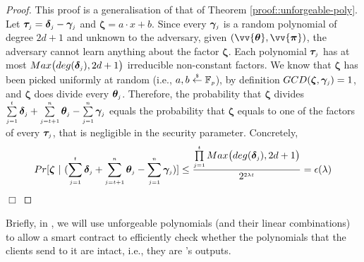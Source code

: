 \begin{proof}  
This proof is a generalisation of that of Theorem \ref{proof::unforgeable-poly}.  
Let $\bm\tau_{\scriptscriptstyle j}=\bm\delta_{\scriptscriptstyle j}-\bm\gamma_{\scriptscriptstyle j}$ and $\bm\zeta=a\cdot x+b$. Since  every $\bm\gamma_{\scriptscriptstyle j}$ is a random polynomial of degree $2d+1$ and unknown to the adversary, given $(\vv{\bm\theta}, \vv{\bm\pi})$,  the adversary cannot learn anything about the factor $\bm\zeta$. Each polynomial $\bm\tau_{\scriptscriptstyle j}$ has at most $Max\big(deg(\bm\delta_{\scriptscriptstyle j}), 2d+1\big)$ irreducible non-constant factors. 
%
%
We  know that $\bm\zeta$ has been picked uniformly at random (i.e., $a,b
\stackrel{\scriptscriptstyle \$}\leftarrow \mathbb F_{\scriptscriptstyle p}$), by definition $GCD(\bm\zeta, \bm\gamma_{\scriptscriptstyle j})=1$, and $\bm\zeta$  does divide every $\bm\theta_{\scriptscriptstyle j}$. Therefore, the probability that $\bm\zeta$ divides $\sum\limits_{\scriptscriptstyle j=1}^{\scriptscriptstyle t}\bm\delta_{\scriptscriptstyle j} + \sum\limits_{\scriptscriptstyle j=t+1}^{\scriptscriptstyle n}\bm\theta_{\scriptscriptstyle j} - \sum\limits_{\scriptscriptstyle j=1}^{\scriptscriptstyle n}\bm\gamma_{\scriptscriptstyle j}$ equals the probability that $\bm\zeta$ equals to one of the factors of  every $\bm\tau_{\scriptscriptstyle j}$, that is negligible in the security parameter. Concretely,
%
$$Pr[ \bm\zeta \ | \ (\sum\limits_{\scriptscriptstyle j=1}^{\scriptscriptstyle t}\bm\delta_{\scriptscriptstyle j} + \sum\limits_{\scriptscriptstyle j=t+1}^{\scriptscriptstyle n}\bm\theta_{\scriptscriptstyle j} - \sum\limits_{\scriptscriptstyle j=1}^{\scriptscriptstyle n}\bm\gamma_{\scriptscriptstyle j} ) ]\leq  \frac{\prod \limits^{\scriptscriptstyle t}_{\scriptscriptstyle j=1}Max\big(deg(\bm\delta_{\scriptscriptstyle j}), 2d+1\big)} {2^{\scriptscriptstyle 2\lambda t}}=\epsilon(\lambda)$$
%
\hfill\(\Box\)
\end{proof} 


Briefly, in \withFai, we will use unforgeable polynomials (and their linear combinations) to allow a smart contract to efficiently check whether the polynomials that the clients send to it are intact, i.e., they are \vopr's outputs.







